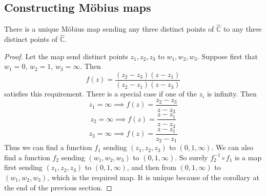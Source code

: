 \subsection{Constructing M\"obius maps}
\begin{theorem}
	There is a unique M\"obius map sending any three distinct points of \(\hat{\mathbb C}\) to any three distinct points of \(\hat{\mathbb C}\).
\end{theorem}
\begin{proof}
	Let the map send distinct points \(z_1, z_2, z_3\) to \(w_1, w_2, w_3\).
	Suppose first that \(w_1 = 0\), \(w_2 = 1\), \(w_3 = \infty\).
	Then
	\[
		f(z) = \frac{(z_2 - z_3)(z - z_1)}{(z_2 - z_1)(z - z_3)}
	\]
	satisfies this requirement.
	There is a special case if one of the \(z_i\) is infinity.
	Then
	\[
		z_1 = \infty \implies f(z) = \frac{z_2 - z_3}{z - z_3}
	\]
	\[
		z_2 = \infty \implies f(z) = \frac{z - z_1}{z - z_3}
	\]
	\[
		z_3 = \infty \implies f(z) = \frac{z - z_1}{z_2 - z_1}
	\]
	Thus we can find a function \(f_1\) sending \((z_1, z_2, z_3)\) to \((0, 1, \infty)\).
	We can also find a function \(f_2\) sending \((w_1, w_2, w_3)\) to \((0, 1, \infty)\).
	So surely \(f_2^{-1}\circ f_1\) is a map first sending \((z_1, z_2, z_3)\) to \((0, 1, \infty)\), and then from \((0, 1, \infty)\) to \((w_1, w_2, w_3)\), which is the required map.
	It is unique because of the corollary at the end of the previous section.
\end{proof}


